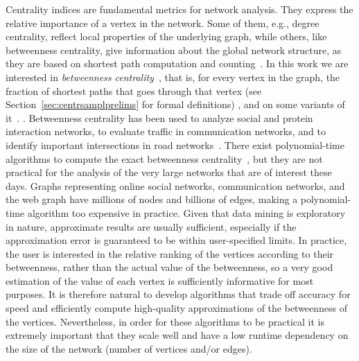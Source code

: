 Centrality indices are fundamental metrics for network analysis. They express the
relative importance of a vertex in the network. Some of them, e.g., degree
centrality, reflect local properties of the underlying graph, while others,
like betweenness centrality, give information about the global network
structure, as they are based on shortest path computation and counting~\citep{Newman10}. In
this work we are interested in \emph{betweenness
centrality}~\citep{Anthonisse71,Freeman77}, that is, for every vertex in the
graph, the fraction of shortest paths that goes through that vertex (see
Section~\ref{sec:centrsamplprelims} for formal definitions)
\ifproof
, and on some variants of it~\citep{OpsahlAS10,BorgattiE06,Brandes08}. %
\else
. %
\fi
Betweenness centrality has been used to analyze social and protein interaction
networks, to evaluate traffic in communication networks, and to identify
important intersections in road networks~\citep{Newman10,GeisbergerSS08}. There
exist polynomial-time algorithms to compute the exact betweenness
centrality~\citep{Brandes01}, but they are not practical for the analysis of the
very large networks that are of interest these days. Graphs representing online
social networks, communication networks, and the web graph have millions of
nodes and billions of edges, making a polynomial-time algorithm too expensive in
practice. Given that data mining is exploratory in nature, approximate results
are usually sufficient, especially if the approximation error is guaranteed to
be within user-specified limits. In practice, the user is interested in the
relative ranking of the vertices according to their betweenness, rather than the
actual value of the betweenness, so a very good estimation of the value of each
vertex is sufficiently informative for most purposes. It is therefore natural to
develop algorithms that trade off accuracy for speed and efficiently compute
high-quality approximations of the betweenness of the vertices.  Nevertheless,
in order for these algorithms to be practical it is extremely important that
they scale well and have a low runtime dependency on the size of the network
(number of vertices and/or edges).

